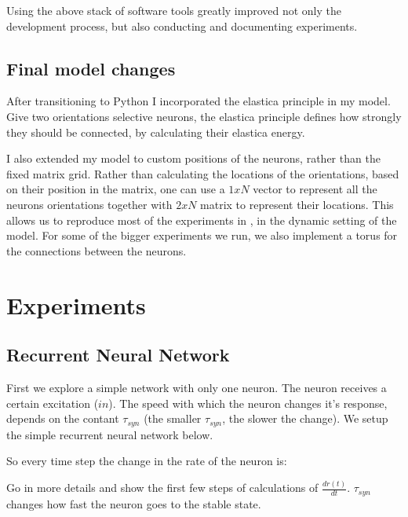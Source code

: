 Using the above stack of software tools greatly improved not only the development process, but also conducting and documenting experiments.

\section{Final model changes}
After transitioning to Python I incorporated the elastica principle in my model. Give two orientations selective neurons, the elastica principle defines how strongly they should be connected, by calculating their elastica energy.

I also extended my model to custom positions of the neurons, rather than the fixed matrix grid. Rather than calculating the locations of the orientations, based on their position in the matrix, one can use a $1xN$ vector to represent all the neurons orientations together with $2xN$ matrix to represent their locations. This allows us to reproduce most of the experiments in \cite{keemink2015unified}, in the dynamic setting of the model. For some of the bigger experiments we run, we also implement a torus for the connections between the neurons.


\chapter{Experiments}

\section{Recurrent Neural Network}

First we explore a simple network with only one neuron. The neuron receives a certain excitation ($in$). The speed with which the neuron changes it's response, depends on the contant $\tau_{syn}$ (the smaller $\tau_{syn}$, the slower the change). We setup the simple recurrent neural network below.


So every time step the change in the rate of the neuron is:



Go in more details and show the first few steps of calculations of $\frac{dr(t)}{dt}$. $\tau_{syn}$ changes how fast the neuron goes to the stable state.


